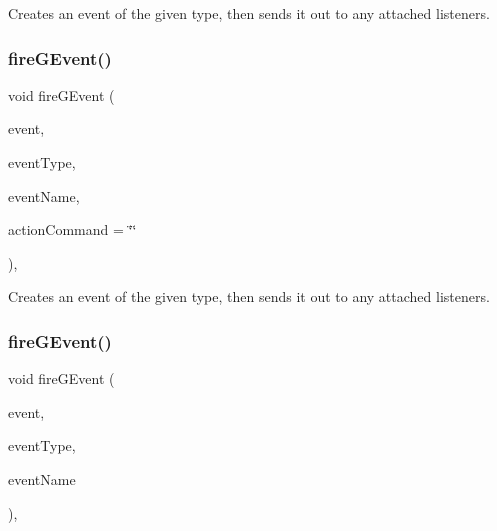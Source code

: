 Creates an event of the given type, then sends it out to any attached listeners. 

\mbox{\label{classGObservable_a119318675d2165bdf7dd853aaf881d4b}} 
\subsubsection{\texorpdfstring{fire\+G\+Event()}{fireGEvent()}\hspace{0.1cm}{\footnotesize\ttfamily [4/8]}}
{\footnotesize\ttfamily void fire\+G\+Event (\begin{DoxyParamCaption}\item[{Q\+Mouse\+Event $\ast$}]{event,  }\item[{Event\+Type}]{event\+Type,  }\item[{const std\+::string \&}]{event\+Name,  }\item[{const std\+::string \&}]{action\+Command = {\ttfamily \char`\"{}\char`\"{}} }\end{DoxyParamCaption})\hspace{0.3cm}{\ttfamily [protected]}, {\ttfamily [virtual]}}



Creates an event of the given type, then sends it out to any attached listeners. 

\mbox{\label{classGObservable_a63fd9034e1e1633c1c38eb342bfd34e9}} 
\subsubsection{\texorpdfstring{fire\+G\+Event()}{fireGEvent()}\hspace{0.1cm}{\footnotesize\ttfamily [5/8]}}
{\footnotesize\ttfamily void fire\+G\+Event (\begin{DoxyParamCaption}\item[{Q\+Resize\+Event $\ast$}]{event,  }\item[{Event\+Type}]{event\+Type,  }\item[{const std\+::string \&}]{event\+Name }\end{DoxyParamCaption})\hspace{0.3cm}{\ttfamily [protected]}, {\ttfamily [virtual]}}



